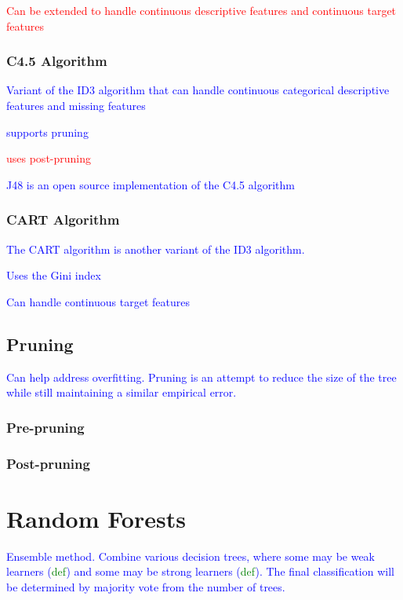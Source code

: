 \textcolor{red}{Can be extended to handle continuous descriptive features and continuous target features}

\subsubsection{C4.5 Algorithm}

\textcolor{blue}{Variant of the {ID3 algorithm} that can handle continuous categorical descriptive features and missing features}

\textcolor{blue}{supports pruning}

\textcolor{red}{uses post-pruning}

\textcolor{blue}{{J48} is an open source implementation of the C4.5 algorithm}

\subsubsection{CART Algorithm}

\textcolor{blue}{The CART algorithm is another variant of the ID3 algorithm.}

\textcolor{blue}{Uses the Gini index}

\textcolor{blue}{Can handle continuous target features}

\subsection{Pruning}

\textcolor{blue}{Can help address overfitting. Pruning is an attempt to reduce the size of the tree while still maintaining a similar empirical error.}

\subsubsection{Pre-pruning}

\subsubsection{Post-pruning}

\section{Random Forests}

\textcolor{blue}{Ensemble method. Combine various decision trees, where some may be weak learners (\textcolor{green}{def}) and some may be strong learners (\textcolor{green}{def}). The final classification will be determined by majority vote from the number of trees.}



